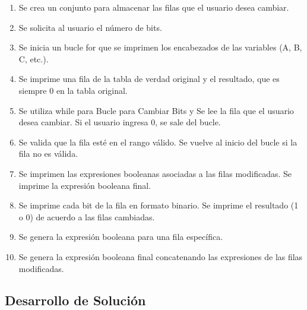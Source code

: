 \begin{enumerate}
  \item Se crea un conjunto para almacenar las filas que el usuario desea cambiar.
  \item Se solicita al usuario el número de bits.
  \item Se inicia un bucle for que se imprimen los encabezados de las variables (A, B, C, etc.).
  \item Se imprime una fila de la tabla de verdad original y  el resultado, que es siempre 0 en la tabla original.
  \item  Se utiliza while para Bucle para Cambiar Bits y Se lee la fila que el usuario desea cambiar.
   Si el usuario ingresa 0, se sale del bucle.
  \item Se valida que la fila esté en el rango válido. Se vuelve al inicio del bucle si la fila no es válida.
  \item Se imprimen las expresiones booleanas asociadas a las filas modificadas. Se imprime la expresión booleana final.
  \item Se imprime cada bit de la fila en formato binario. Se imprime el resultado (1 o 0) de acuerdo a las filas cambiadas.
  \item Se genera la expresión booleana para una fila específica.
  \item Se genera la expresión booleana final concatenando las expresiones de las filas modificadas.
  
\end{enumerate}

\subsection{Desarrollo de Solución}


